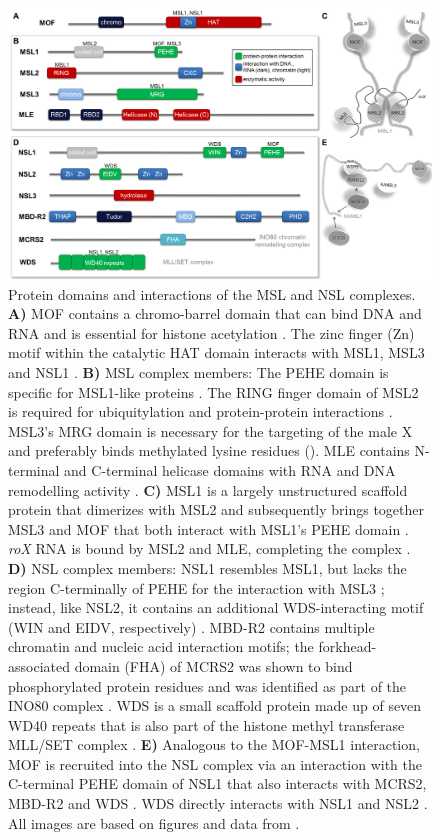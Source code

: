 \begin{figure}
\includegraphics[width=1\textwidth]{Figures/MOFcomplexes.png}
\begin{footnotesize}
\caption[Protein domains and interactions of the MSL and NSL complexes.]{\textsf{Protein domains and interactions of the MSL and NSL complexes.
\textbf{A)} MOF contains a chromo-barrel domain that can bind DNA and RNA and is essential for histone acetylation \citep{Conrad2012}. The zinc finger (Zn) motif within the catalytic HAT domain interacts with MSL1, MSL3 and NSL1 \citep{Morales2004,Kadlec2011}.
\textbf{B)} MSL complex members: The PEHE domain is specific for MSL1-like proteins \citep{Marin2003}. The RING finger domain of MSL2 is required for ubiquitylation and protein-protein interactions \citep{Copps1998,Kruse2009}. MSL3's MRG domain is necessary for the targeting of the male X \citep{Buscaino2003} and preferably binds methylated lysine residues \citep{Moore2010} (). MLE contains N-terminal and C-terminal helicase domains with RNA and DNA remodelling activity \citep{Lee1997}.
\textbf{C)} MSL1 is a largely unstructured scaffold protein that dimerizes with MSL2 and subsequently brings together MSL3 and MOF that both interact with MSL1's PEHE domain \citep{Scott2000,Kadlec2011}. \textit{roX} RNA is bound by MSL2 and MLE, completing the complex \citep{Ilik2013}.
\textbf{D)} NSL complex members: NSL1 resembles MSL1, but lacks the region C-terminally of PEHE for the interaction with MSL3 \citep{Smith2005}; instead, like NSL2, it contains an additional WDS-interacting motif (WIN and EIDV, respectively) \citep{Dias2014}. MBD-R2 contains multiple chromatin and nucleic acid interaction motifs; the forkhead-associated domain (FHA) of MCRS2 was shown to bind phosphorylated protein residues and was identified as part of the INO80 complex \citep{}. WDS is a small scaffold protein made up of seven WD40 repeats that is also part of the histone methyl transferase MLL/SET complex \citep{Trievel2009}. 
\textbf{E)} Analogous to the MOF-MSL1 interaction, MOF is recruited into the NSL complex via an interaction with the C-terminal PEHE domain of NSL1 that also interacts with MCRS2, MBD-R2 and WDS \citep{Kadlec2011, Raja2010, Dias2014}. WDS directly interacts with NSL1 and NSL2 \citep{Dias2014}. 
All images are based on figures and data from \citep{Mendjan2006,Kadlec2011,Raja2010,Hallacli2012,Dias2014}.
}}
\label{fig:MOFcomplexes}
\end{footnotesize}
\end{figure}
